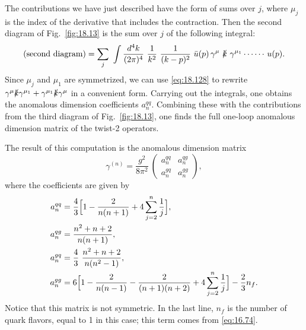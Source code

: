 The contributions we have just described have the form of sums over $j$,
where $\mu_j$ is the index of the derivative that includes the contraction.
Then the second diagram of Fig.~\ref{fig:18.13} is the sum over $j$ of the
following integral:
\begin{equation}
  \text{(second diagram)} = \sum_j\ \int \frac{d^4k}{(2\pi)^4}\ \frac{1}{k^2}
    \ \frac{1}{(k-p)^2}\ \bar{u}(p)\,\gamma^\mu\ \slashed{k}\ \gamma^{\mu_1}
    \cdots \cdots \,u(p) .
  \label{eq:18.168}
\end{equation}
Since $\mu_j$ and $\mu_1$ are symmetrized, we can use \eqref{eq:18.128} to
rewrite $\gamma^\mu\slashed{k}\gamma^{\mu_1} + \gamma^{\mu_1}\slashed{k}
\gamma^\mu$ in a convenient form.  Carrying out the integrals, one obtains
the anomalous dimension coefficients $a_n^{qq}$.  Combining these with the
contributions from the third diagram of Fig.~\ref{fig:18.13}, one finds the
full one-loop anomalous dimension matrix of the twist-2 operators.

The result of this computation is the anomalous dimension matrix
\begin{equation}
  \gamma^{(n)} = \frac{g^2}{8\pi^2}\ \begin{pmatrix}
    a_n^{qq} & a_n^{qg}\\ a_n^{gq} & a_n^{gg}
  \end{pmatrix} ,
  \label{eq:18.181}
\end{equation}
where the coefficients are given by
\begin{equation}
  \begin{aligned}
    a_n^{qq} &= \frac{4}{3}\Bigl[ 1 - \frac{2}{n(n+1)} + 4\sum_{j=2}^{n}
      \frac{1}{j} \Bigr],\\
    a_n^{qg} &= \frac{n^2+n+2}{n(n+1)},\\
    a_n^{gq} &= \frac{4}{3}\ \frac{n^2+n+2}{n(n^2-1)},\\
    a_n^{gg} &= 6\Bigl[ 1 - \frac{2}{n(n-1)} - \frac{2}{(n+1)(n+2)}
      + 4\sum_{j=2}^{n}\frac{1}{j} \Bigr] - \frac{2}{3}n_f .
  \end{aligned}
  \label{eq:18.181b}
\end{equation}
Notice that this matrix is not symmetric.  In the last line, $n_f$ is the
number of quark flavors, equal to 1 in this case; this term comes from
\eqref{eq:16.74}.

